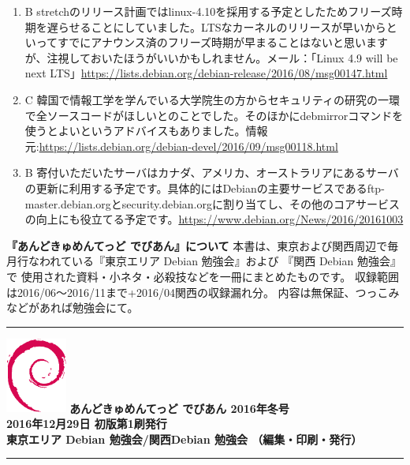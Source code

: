 \documentclass[mingoth,a4paper]{jsarticle}
\begin{document}
\begin{enumerate}
\item  B stretchのリリース計画ではlinux-4.10を採用する予定としたためフリーズ時期を遅らせることにしていました。LTSなカーネルのリリースが早いからといってすでにアナウンス済のフリーズ時期が早まることはないと思いますが、注視しておいたほうがいいかもしれません。メール：「Linux 4.9 will be next LTS」\url {https://lists.debian.org/debian-release/2016/08/msg00147.html}\\
\item  C 韓国で情報工学を学んでいる大学院生の方からセキュリティの研究の一環で全ソースコードがほしいとのことでした。そのほかにdebmirrorコマンドを使うとよいというアドバイスもありました。情報元:\url {https://lists.debian.org/debian-devel/2016/09/msg00118.html}\\
\item  B 寄付いただいたサーバはカナダ、アメリカ、オーストラリアにあるサーバの更新に利用する予定です。具体的にはDebianの主要サービスであるftp-master.debian.orgとsecurity.debian.orgに割り当てし、その他のコアサービスの向上にも役立てる予定です。\url {https://www.debian.org/News/2016/20161003}\\

\end{enumerate}


\newpage
\thispagestyle{empty}\mbox{}
\newpage

\thispagestyle{empty}
{
\large
\begin{itembox}{\bf 『あんどきゅめんてっど でびあん』について}
本書は、東京および関西周辺で毎月行なわれている『東京エリア Debian 勉強会』および
『関西 Debian 勉強会』で
使用された資料・小ネタ・必殺技などを一冊にまとめたものです。
収録範囲は2016/06〜2016/11まで+2016/04関西の収録漏れ分。
内容は無保証、つっこみなどがあれば勉強会にて。
\end{itembox}
}

\vspace*{13cm}
{\color{dancerlightblue}\rule{\hsize}{1mm}}
\vspace{2mm}
\includegraphics[width=2cm]{image200502/openlogo-nd.eps}
\noindent \Large \bf あんどきゅめんてっど でびあん 2016年冬号\\
\noindent \normalfont 2016年12月29日 \hspace{5mm}  初版第1刷発行\\
\noindent \normalfont 東京エリア Debian 勉強会/関西Debian 勉強会 （編集・印刷・発行）\\
{\color{dancerdarkblue}\rule{\hsize}{1mm}}
\end{document}
